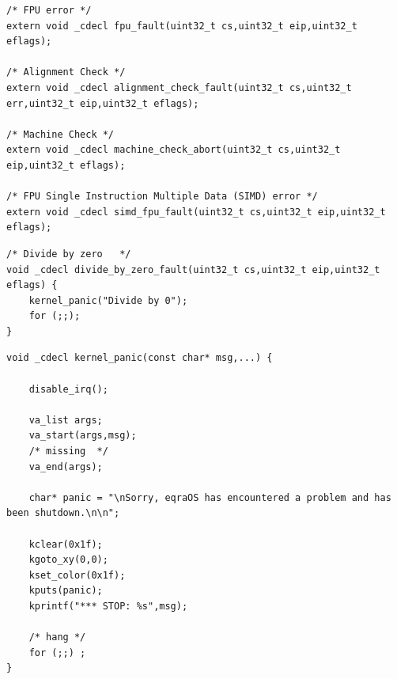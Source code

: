 \documentclass[document.tex]{subfiles}
\begin{document}
\begin{english}
\begin{lstlisting}[label=lst:exception.h,caption=\en{kernel/exception.h}]
/* FPU error */
extern void _cdecl fpu_fault(uint32_t cs,uint32_t eip,uint32_t eflags);

/* Alignment Check */
extern void _cdecl alignment_check_fault(uint32_t cs,uint32_t err,uint32_t eip,uint32_t eflags);

/* Machine Check */
extern void _cdecl machine_check_abort(uint32_t cs,uint32_t eip,uint32_t eflags);

/* FPU Single Instruction Multiple Data (SIMD) error */
extern void _cdecl simd_fpu_fault(uint32_t cs,uint32_t eip,uint32_t eflags);
\end{lstlisting}
\end{english}

\begin{english}

\lstset{numberstyle=\tiny,numbers=left,stepnumber=1,numbersep=5pt,tabsize=2,extendedchars=true,breaklines=true,frame=b,showspaces=false, showtabs=false,xleftmargin=10pt,framexleftmargin=10pt,framexrightmargin=5pt,framexbottommargin=4pt,showstringspaces=false,language=C++}


\begin{lstlisting}[label=lst:exception.cpp,caption=\en{kernel/exception.cpp}]
/* Divide by zero	*/
void _cdecl divide_by_zero_fault(uint32_t cs,uint32_t eip,uint32_t eflags) {
	kernel_panic("Divide by 0");
	for (;;);
}
\end{lstlisting}
\end{english}

\begin{english}

\lstset{numberstyle=\tiny,numbers=left,stepnumber=1,numbersep=5pt,tabsize=2,extendedchars=true,breaklines=true,frame=b,showspaces=false, showtabs=false,xleftmargin=10pt,framexleftmargin=10pt,framexrightmargin=5pt,framexbottommargin=4pt,showstringspaces=false,language=C++}


\begin{lstlisting}[label=lst:panic.cpp,caption=\en{kernel/panic.cpp}]
void _cdecl kernel_panic(const char* msg,...) {
	
	disable_irq();
	
	va_list args;
	va_start(args,msg);
	/* missing	*/
	va_end(args);
	
	char* panic = "\nSorry, eqraOS has encountered a problem and has been shutdown.\n\n";
	
	kclear(0x1f);
	kgoto_xy(0,0);
	kset_color(0x1f);
	kputs(panic);
	kprintf("*** STOP: %s",msg);
	
	/* hang	*/
	for (;;) ;
}
\end{lstlisting}
\end{english}
\end{document}
